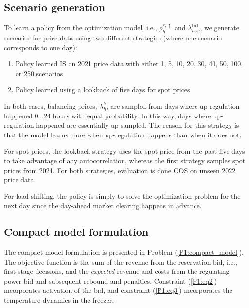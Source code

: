 \subsection{Scenario generation}\label{sec:scenario_generation}

To learn a policy from the optimization model, i.e., $p_{h}^{r,\uparrow}$ and $\lambda_{h,\omega}^{\text{bid}}$, we generate scenarios for price data using two different strategies (where one scenario corresponds to one day):

\begin{enumerate}
    \item Policy learned IS on 2021 price data with either 1, 5, 10, 20, 30, 40, 50, 100, or 250 scenarios
    \item Policy learned using a lookback of five days for spot prices
\end{enumerate}

In both cases, balancing prices, $\lambda_{h}^{b}$, are sampled from days where up-regulation happened $0 \ldots 24$ hours with equal probability. In this way, days where up-regulation happened are essentially up-sampled. The reason for this strategy is that the model learns more when up-regulation happens than when it does not.

For spot prices, the lookback strategy uses the spot price from the past five days to take advantage of any autocorrelation, whereas the first strategy samples spot prices from 2021. For both strategies, evaluation is done OOS on unseen 2022 price data.

For load shifting, the policy is simply to solve the optimization problem for the next day since the day-ahead market clearing happens in advance.

\subsection{Compact model formulation}

The compact model formulation is presented in Problem (\ref{P1:compact_model}). The objective function is the sum of the revenue from the reservation bid, i.e., first-stage decisions, and the \textit{expected} revenue and costs from the regulating power bid and subsequent rebound and penalties. Constraint (\ref{P1:eq2}) incorporates activation of the bid, and constraint (\ref{P1:eq3}) incorporates the temperature dynamics in the freezer.


